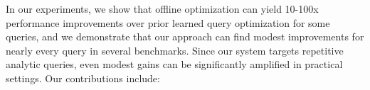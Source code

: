 In our experiments, we show that offline optimization can yield 10-100x performance improvements over prior learned query optimization for some queries, and we demonstrate that our approach can find modest improvements for nearly every query in several benchmarks. Since our system targets repetitive analytic queries, even modest gains can be significantly amplified in practical settings. Our contributions include:






